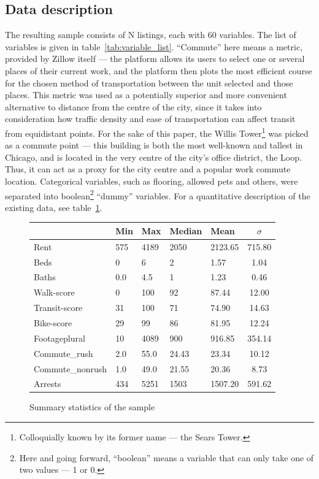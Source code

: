 \documentclass[12pt]{report}
\begin{document}
\subsection{Data description}

The resulting sample consists of N listings, each with 60 variables. The list of variables is given in table~\ref{tab:variable_list}. ``Commute'' here means a metric, provided by Zillow itself --- the platform allows its users to select one or several places of their current work, and the platform then plots the most efficient course for the chosen method of transportation between the unit selected and those places. This metric was used as a potentially superior and more convenient alternative to distance from the centre of the city, since it takes into consideration how traffic density and ease of transportation can affect transit from equidistant points. For the sake of this paper, the Willis Tower\footnote{Colloquially known by its former name --- the Sears Tower.} was picked as a commute point --- this building is both the most well-known and tallest in Chicago, and is located in the very centre of the city's office district, the Loop. Thus, it can act as a proxy for the city centre and a popular work commute location. Categorical variables, such as flooring, allowed pets and others, were separated into boolean\footnote{Here and going forward, ``boolean'' means a variable that can only take one of two values --- 1 or 0.} ``dummy'' variables. For a quantitative description of the existing data, see table~\ref{tab:summary_statistics}.

\begin{figure}[ht]
	\centering
	\begin{tabular}{l l l l l S[table-format=3.2]}
		\toprule
		                 & Min & Max  & Median & Mean    & $\sigma$ \\
		\midrule
		Rent             & 575 & 4189 & 2050   & 2123.65 & 715.80   \\
		Beds             & 0   & 6    & 2      & 1.57    & 1.04     \\
		Baths            & 0.0 & 4.5  & 1      & 1.23    & 0.46     \\
		Walk-score       & 0   & 100  & 92     & 87.44   & 12.00    \\
		Transit-score    & 31  & 100  & 71     & 74.90   & 14.63    \\
		Bike-score       & 29  & 99   & 86     & 81.95   & 12.24    \\
		Footageplural    & 10  & 4089 & 900    & 916.85  & 354.14   \\
		Commute\_rush    & 2.0 & 55.0 & 24.43  & 23.34   & 10.12    \\
		Commute\_nonrush & 1.0 & 49.0 & 21.55  & 20.36   & 8.73     \\
		Arrests          & 434 & 5251 & 1503   & 1507.20 & 591.62   \\
		\bottomrule
	\end{tabular}
	\caption{Summary statistics of the sample}\label{tab:summary_statistics}
\end{figure}
\end{document}
